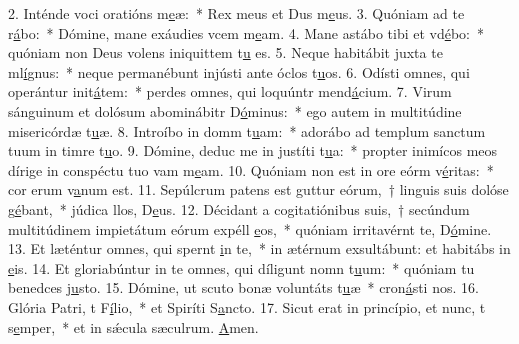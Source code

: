 2. Inténde voci oratións m\uline{e}æ:~* Rex meus et Dus m\uline{e}us.
3. Quóniam ad te r\uline{á}bo:~* Dómine, mane exáudies vcem m\uline{e}am.
4. Mane astábo tibi et vd\uline{é}bo:~* quóniam non Deus volens iniquittem t\uline{u} es.
5. Neque habitábit juxta te ml\uline{í}gnus:~* neque permanébunt injústi ante óclos t\uline{u}os.
6. Odísti omnes, qui operántur init\uline{á}tem:~* perdes omnes, qui loquúntr mend\uline{á}cium.
7. Virum sánguinum et dolósum abominábitr D\uline{ó}minus:~* ego autem in multitúdine misericórdæ t\uline{u}æ.
8. Introíbo in domm t\uline{u}am:~* adorábo ad templum sanctum tuum in timre t\uline{u}o.
9. Dómine, deduc me in justíti t\uline{u}a:~* propter inimícos meos dírige in conspéctu tuo vam m\uline{e}am.
10. Quóniam non est in ore eórm v\uline{é}ritas:~* cor erum v\uline{a}num est.
11. Sepúlcrum patens est guttur eórum,~† linguis suis dolóse g\uline{é}bant,~* júdica llos, D\uline{e}us.
12. Décidant a cogitatiónibus suis,~† secúndum multitúdinem impietátum eórum expéll \uline{e}os,~* quóniam irritavérnt te, D\uline{ó}mine.
13. Et læténtur omnes, qui spernt \uline{i}n te,~* in ætérnum exsultábunt: et habitábs in \uline{e}is.
14. Et gloriabúntur in te omnes, qui díligunt nomn t\uline{u}um:~* quóniam tu benedces j\uline{u}sto.
15. Dómine, ut scuto bonæ voluntáts t\uline{u}æ~* cron\uline{á}sti nos.
16. Glória Patri, t F\uline{í}lio,~* et Spiríti S\uline{a}ncto.
17. Sicut erat in princípio, et nunc, t s\uline{e}mper,~* et in sǽcula sæculrum. \uline{A}men.

